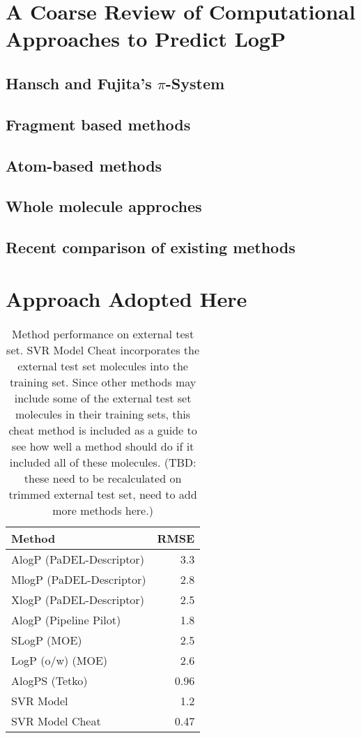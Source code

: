 \section*{A Coarse Review of Computational Approaches to Predict LogP}

\subsection*{Hansch and Fujita's $\pi$-System}

\subsection*{Fragment based methods}

\subsection*{Atom-based methods}

\subsection*{Whole molecule approches}

\subsection*{Recent comparison of existing methods}

\section*{Approach Adopted Here}

\begin{table}[htbp]
  \centering
  \caption{Method performance on external test set. SVR Model Cheat incorporates the external test set molecules into the training set. Since other methods may include some of the external test set molecules in their training sets, this cheat method is included as a guide to see how well a method should do if it included all of these molecules. (TBD: these need to be recalculated on trimmed external test set, need to add more methods here.)}
    \begin{tabular}{lr}
    \toprule
    Method & RMSE \\
    \midrule
    AlogP (PaDEL-Descriptor) & 3.3 \\
    MlogP (PaDEL-Descriptor) & 2.8 \\ 
    XlogP (PaDEL-Descriptor) & 2.5 \\
    AlogP (Pipeline Pilot) & 1.8 \\
    SLogP (MOE) & 2.5 \\
    LogP (o/w) (MOE) & 2.6 \\
    AlogPS (Tetko) & 0.96 \\
    SVR Model & 1.2 \\
    SVR Model Cheat & 0.47 \\
    \bottomrule
    \end{tabular}%
  \label{tab:external_comparison}%
\end{table}%

